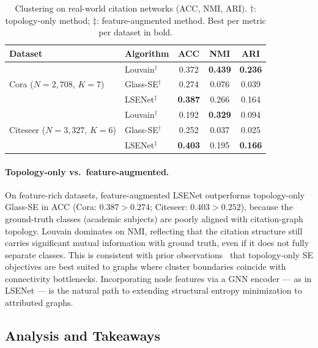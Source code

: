 \begin{table}[ht]
\centering
\caption{Clustering on real-world citation networks (ACC, NMI, ARI).
$\dagger$: topology-only method; $\ddagger$: feature-augmented method.
Best per metric per dataset in bold.}
\label{tab:realworld}
\renewcommand{\arraystretch}{1.15}
\begin{tabular}{llccc}
\toprule
\textbf{Dataset} & \textbf{Algorithm} & \textbf{ACC} & \textbf{NMI} & \textbf{ARI} \\
\midrule
\multirow{3}{*}{Cora ($N{=}2{,}708$, $K{=}7$)}
  & Louvain$^\dagger$     & 0.372 & \textbf{0.439} & \textbf{0.236} \\
  & Glass-SE$^\dagger$    & 0.274 & 0.076 & 0.039 \\
  & LSENet$^\ddagger$     & \textbf{0.387} & 0.266 & 0.164 \\
\midrule
\multirow{3}{*}{Citeseer ($N{=}3{,}327$, $K{=}6$)}
  & Louvain$^\dagger$     & 0.192 & \textbf{0.329} & 0.094 \\
  & Glass-SE$^\dagger$    & 0.252 & 0.037 & 0.025 \\
  & LSENet$^\ddagger$     & \textbf{0.403} & 0.195 & \textbf{0.166} \\
\bottomrule
\end{tabular}
\end{table}

\paragraph{Topology-only vs.\ feature-augmented.}
On feature-rich datasets, feature-augmented LSENet outperforms
topology-only Glass-SE in ACC (Cora: $0.387 > 0.274$; Citeseer: $0.403 > 0.252$),
because the ground-truth classes (academic subjects) are poorly aligned with
citation-graph topology.
Louvain dominates on NMI, reflecting that the citation structure still carries
significant mutual information with ground truth, even if it does not fully
separate classes.
This is consistent with prior observations~\cite{sun2024lsenet,fortunato2010community}
that topology-only SE objectives are best suited to graphs where cluster
boundaries coincide with connectivity bottlenecks.
Incorporating node features via a GNN encoder — as in LSENet — is the natural
path to extending structural entropy minimization to attributed graphs.

\subsection{Analysis and Takeaways}
\label{subsec:benchmark-discussion}

